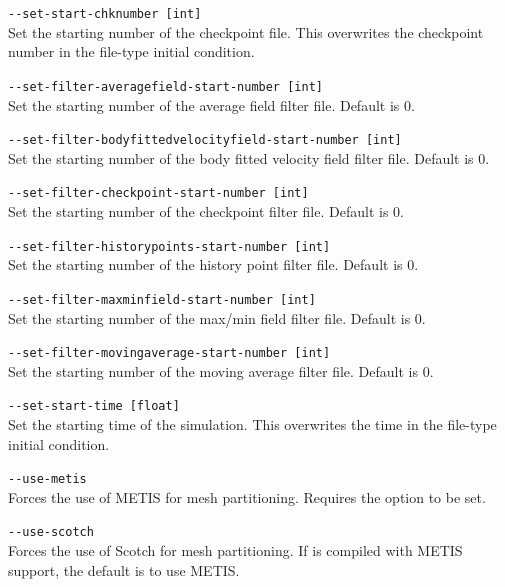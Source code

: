 \lstinline[style=BashInputStyle]{--set-start-chknumber [int]}\\
\hangindent=1.5cm
Set the starting number of the checkpoint file. This overwrites the checkpoint number in the file-type initial condition.

\lstinline[style=BashInputStyle]{--set-filter-averagefield-start-number [int]}\\
\hangindent=1.5cm
Set the starting number of the average field filter file. Default is 0.

\lstinline[style=BashInputStyle]{--set-filter-bodyfittedvelocityfield-start-number [int]}\\
\hangindent=1.5cm
Set the starting number of the body fitted velocity field filter file. Default is 0.

\lstinline[style=BashInputStyle]{--set-filter-checkpoint-start-number [int]}\\
\hangindent=1.5cm
Set the starting number of the checkpoint filter file. Default is 0.

\lstinline[style=BashInputStyle]{--set-filter-historypoints-start-number [int]}\\
\hangindent=1.5cm
Set the starting number of the history point filter file. Default is 0.

\lstinline[style=BashInputStyle]{--set-filter-maxminfield-start-number [int]}\\
\hangindent=1.5cm
Set the starting number of the max/min field filter file. Default is 0.

\lstinline[style=BashInputStyle]{--set-filter-movingaverage-start-number [int]}\\
\hangindent=1.5cm
Set the starting number of the moving average filter file. Default is 0.

\lstinline[style=BashInputStyle]{--set-start-time [float]}\\
\hangindent=1.5cm
Set the starting time of the simulation. This overwrites the time in the file-type initial condition.

\lstinline[style=BashInputStyle]{--use-metis}\\
\hangindent=1.5cm
Forces the use of METIS for mesh partitioning. Requires the
 option to be set.

\lstinline[style=BashInputStyle]{--use-scotch}\\
\hangindent=1.5cm
Forces the use of Scotch for mesh partitioning. If \nekpp{} is compiled with
METIS support, the default is to use METIS.
